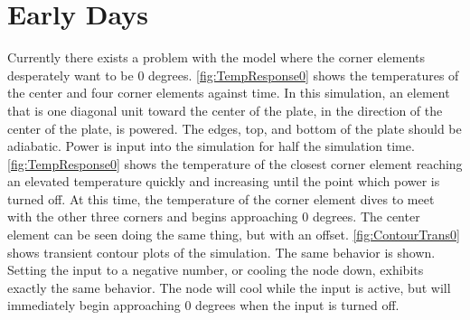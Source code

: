 \documentclass[10pt,twocolumn]{article}
\begin{document}

\section{Early Days}
Currently there exists a problem with the model where the corner elements desperately want to be 0 degrees. \autoref{fig:TempResponse0} shows the temperatures of the center and four corner elements against time. In this simulation, an element that is one diagonal unit toward the center of the plate, in the direction of the center of the plate, is powered. The edges, top, and bottom of the plate should be adiabatic. Power is input into the simulation for half the simulation time. \autoref{fig:TempResponse0} shows the temperature of the closest corner element reaching an elevated temperature quickly and increasing until the point which power is turned off. At this time, the temperature of the corner element dives to meet with the other three corners and begins approaching 0 degrees. The center element can be seen doing the same thing, but with an offset. \autoref{fig:ContourTrans0} shows transient contour plots of the simulation. The same behavior is shown. Setting the input to a negative number, or cooling the node down, exhibits exactly the same behavior. The node will cool while the input is active, but will immediately begin approaching 0 degrees when the input is turned off.
\end{document}
